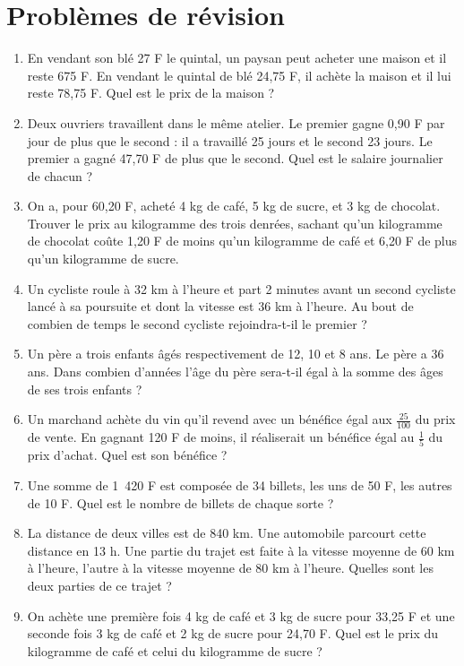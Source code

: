 \documentclass[12 pt]{report}
\theoremstyle{plain}
\newcounter{n}
\begin{document}
\begin{enumerate}
 \end{enumerate}
 
 \chapter{Problèmes de révision}
 \begin{enumerate}
 \item En vendant son blé 27 F le quintal, un paysan peut acheter une maison et il reste 675 F. En vendant le quintal de blé 24,75 F, il achète la maison et il lui reste 78,75 F. Quel est le prix de la maison ? 
 \item Deux ouvriers travaillent dans le même atelier. Le premier gagne 0,90 F par jour de plus que le second : il a travaillé 25 jours et le 
 second 23 jours. Le premier a gagné 47,70 F de plus que le second. Quel est le salaire journalier de chacun ? 
 \item On a, pour 60,20 F, acheté 4 kg de café, 5 kg de sucre, et 3 kg de chocolat. Trouver le prix au kilogramme des trois denrées, sachant qu'un kilogramme de chocolat coûte 1,20 F de moins qu'un kilogramme de café et 6,20 F de plus qu'un kilogramme de sucre. 
 \item Un cycliste roule à 32 km à l'heure et part 2 minutes avant un second cycliste lancé à sa poursuite et dont la vitesse est 36 km à l'heure. Au bout de combien de temps le second cycliste rejoindra-t-il 
 le premier ? 
 \item Un père a trois enfants âgés respectivement de 12, 10 et 8 ans. Le père a 36 ans. Dans combien d'années l'âge du père sera-t-il égal à
 la somme des âges de ses trois enfants ?
 \item Un marchand achète du vin qu'il revend avec un bénéfice égal aux $\frac{25}{100}$ du prix de vente. En gagnant 120 F de moins, il réaliserait un bénéfice égal au $\frac15$ du prix d'achat. Quel est
 son bénéfice ? 
 \item Une somme de 1~420 F est composée de 34 billets, les uns de 50 F, les autres de 10 F. Quel est le nombre de billets de chaque 
 sorte ? 
 \item La distance de deux villes est de 840 km. Une automobile parcourt cette distance en 13 h. Une partie du trajet est faite à la vitesse moyenne de 60 km à l'heure, l'autre à la vitesse moyenne de 80 km à l'heure. Quelles sont les deux parties de ce trajet ?
 \item  On achète une première fois 4 kg de café et 3 kg de sucre pour 33,25 F et une seconde fois 3 kg de café et 2 kg de sucre pour 24,70 F. Quel est le prix du kilogramme de café et celui du kilogramme de sucre ? 

\end{enumerate}
\end{document}
